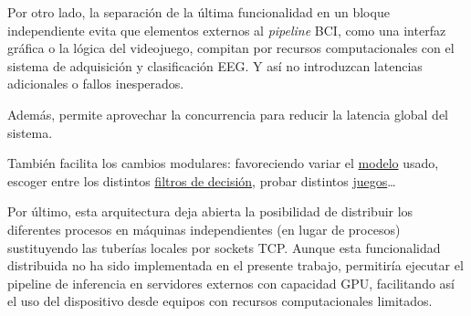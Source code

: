 Por otro lado, la separación de la última funcionalidad en un bloque independiente evita que elementos externos al \textit{pipeline} BCI, como una interfaz gráfica o la lógica del videojuego, compitan por recursos computacionales con el sistema de adquisición y clasificación EEG. Y así no introduzcan latencias adicionales o fallos inesperados.

Además, permite aprovechar la concurrencia para reducir la latencia global del sistema.

También facilita los cambios modulares: favoreciendo variar el \hyperref[sec:modelo]{modelo} usado, escoger entre los distintos \hyperref[subsec:filtros_decision]{filtros de decisión}, probar distintos \hyperref[sec:videojuegosDesarrollados]{juegos}\dots

Por último, esta arquitectura deja abierta la posibilidad de distribuir los diferentes procesos en máquinas independientes (en lugar de procesos) sustituyendo las tuberías locales por sockets TCP. Aunque esta funcionalidad distribuida no ha sido implementada en el presente trabajo, permitiría ejecutar el pipeline de inferencia en servidores externos con capacidad GPU, facilitando así el uso del dispositivo desde equipos con recursos computacionales limitados.
